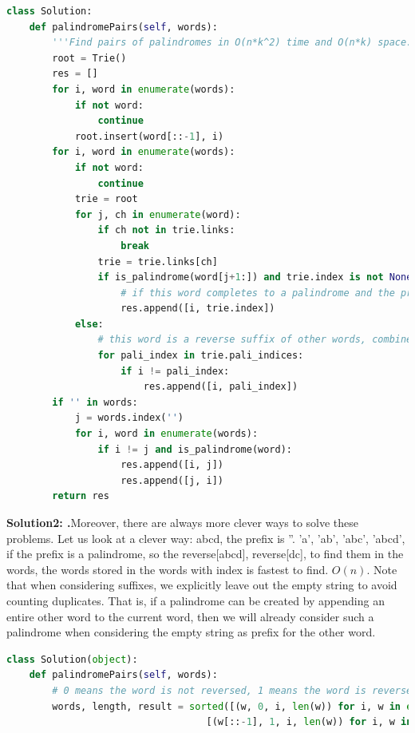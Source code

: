\documentclass[../main.tex]{subfiles}
\begin{document}
\begin{examples}
\begin{lstlisting}[language = Python]
class Solution:
    def palindromePairs(self, words):
        '''Find pairs of palindromes in O(n*k^2) time and O(n*k) space.'''
        root = Trie()
        res = []
        for i, word in enumerate(words):
            if not word:
                continue
            root.insert(word[::-1], i)
        for i, word in enumerate(words):
            if not word:
                continue
            trie = root
            for j, ch in enumerate(word):
                if ch not in trie.links:
                    break
                trie = trie.links[ch]
                if is_palindrome(word[j+1:]) and trie.index is not None and trie.index != i:
                    # if this word completes to a palindrome and the prefix is a word, complete it
                    res.append([i, trie.index])
            else:
                # this word is a reverse suffix of other words, combine with those that complete to a palindrome
                for pali_index in trie.pali_indices:
                    if i != pali_index:
                        res.append([i, pali_index])
        if '' in words:
            j = words.index('')
            for i, word in enumerate(words):
                if i != j and is_palindrome(word):
                    res.append([i, j])
                    res.append([j, i])
        return res
\end{lstlisting}
\textbf{Solution2: .}Moreover, there are always more clever ways to solve these problems. Let us look at a clever way:
 abcd, the prefix is ''. 'a', 'ab', 'abc', 'abcd', if the prefix is a palindrome, so the reverse[abcd], reverse[dc], to find them in the words, the words stored in the words with index is fastest to find. $O(n)$. Note that when considering suffixes, we explicitly leave out the empty string to avoid counting duplicates. That is, if a palindrome can be created by appending an entire other word to the current word, then we will already consider such a palindrome when considering the empty string as prefix for the other word.
 \begin{lstlisting}[language = Python]
 class Solution(object):
    def palindromePairs(self, words):
        # 0 means the word is not reversed, 1 means the word is reversed
        words, length, result = sorted([(w, 0, i, len(w)) for i, w in enumerate(words)] +
                                   [(w[::-1], 1, i, len(w)) for i, w in enumerate(words)]), len(words) * 2, []


\end{lstlisting}
\end{examples}
\end{document}
